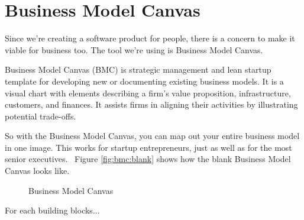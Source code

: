 \section{Business Model Canvas}
\label{sec:bmc}

Since we're creating a software product for people, there is a concern to make it viable for business too.
The tool we're using is Business Model Canvas.

Business Model Canvas (\ac{BMC})
is strategic management and lean startup template for developing new or documenting existing business models.
It is a visual chart with elements describing a firm's value proposition, infrastructure, customers, and finances.
It assists firms in aligning their activities by illustrating potential trade-offs.

So with the Business Model Canvas, you can map out your entire business model in one image. This works for startup entrepreneurs, just as well as for the most senior executives.~\autocite{Strategyzer2011BMC}
Figure \autoref{fig:bmc:blank} shows how the blank Business Model Canvas looks like.

\begin{figure}[htbp]
    \centering
    \caption{Business Model Canvas}
    \label{fig:bmc:blank}
\end{figure}

For each building blocks...


